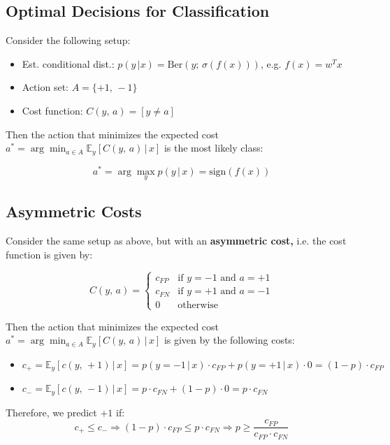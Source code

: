 \documentclass[a4paper]{extarticle}
\begin{document}
\subsection{Optimal Decisions for Classification}

Consider the following setup:
\begin{itemize}
    \item Est. conditional dist.: $p(y \, | x) = \text{Ber}(y; \, \sigma(f(x)))$, e.g. $f(x) = w^Tx$
    \item Action set: $A = \{+1, \, -1\}$
    \item Cost function: $C(y, \, a) = [y \neq a]$
\end{itemize}

Then the action that minimizes the expected cost $a^* = \arg \min_{a \in A} \mathbb{E}_y[C(y, \, a) \, | \, x]$ is the most likely class:

\[
    a^* = \arg \max_y p(y \, | \, x) = \text{sign}(f(x))
\]

\subsection{Asymmetric Costs}

Consider the same setup as above, but with an \textbf{asymmetric cost,} i.e. the cost function is given by:

\[
    C(y, \, a) = \begin{cases}
        c_{FP} &\text{if } y = -1 \text{ and } a = +1\\
        c_{FN} &\text{if } y = +1 \text{ and } a = -1\\
        0 &\text{otherwise}
    \end{cases}
\]

Then the action that minimizes the expected cost $a^* = \arg \min_{a \in A} \mathbb{E}_y[C(y, \, a) \, | \, x]$ is given by the following costs:

\begin{itemize}
    \item $c_+ = \mathbb{E}_y[c(y, \, +1) \, | \, x] = p(y = -1 \, | \, x) \cdot c_{FP} + p(y = +1 \, | \, x) \cdot 0 = (1 - p) \cdot c_{FP}$
    \item $c_- = \mathbb{E}_y[c(y, \, -1) \, | \, x] = p \cdot c_{FN} + (1 - p) \cdot 0 = p \cdot c_{FN}$
\end{itemize}

Therefore, we predict $+1$ if:
\[
    c_+ \leq c_- \Rightarrow (1 - p) \cdot c_{FP} \leq p \cdot c_{FN} \Rightarrow p \geq \frac{c_{FP}}{c_{FP} \cdot c_{FN}}
\]
\end{document}
